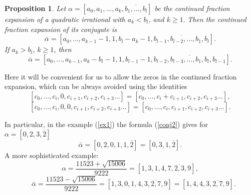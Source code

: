 \documentclass[11pt,reqno]{amsart}
\newtheorem{prop}{Proposition}
\begin{document}
\begin{prop} \label{thm:conj} Let $\alpha = [a_0, a_1, \ldots, a_k, \overline{b_1, \ldots, b_l}]$ be the continued fraction expansion of a quadratic irrational with $a_k < b_l$, and $k \geq 1.$ Then the continued fraction expansion of its conjugate is
\begin{equation}
\label{conj1}
\overline{\alpha} = [a_0, \ldots, a_{k-1}-1, 1, b_l-a_k-1, \overline{b_{l-1}, b_{l-2}, \ldots, b_1, b_l}].
\end{equation}
If $a_k > b_l$, $k \geq 1$, then 
\begin{equation}
\label{conj2}
\overline{\alpha} = \left[a_0, \ldots, a_{k-1}, a_k - b_l-1, 1, b_{l-1}-1, \overline{b_{l-2}, b_{l-3}, \ldots, b_1, b_l, b_{l-1}}\right].
\end{equation}
\end{prop}

Here it will be convenient for us to allow the zeros in the continued fraction expansion, which can be always avoided using the identities
\begin{equation} \label{eq:onezero}
\left[ c_0, \ldots, c_i, 0, c_{i+1}, c_{i+2}, c_{i+3} \ldots \right] = \left[ c_0, \ldots, c_i + c_{i+1}, c_{i+2}, c_{i+3} \ldots \right],
\end{equation}
\begin{equation} \label{eq:twozero}
\left[ c_0, \ldots, c_i, 0, 0, c_{i+1}, c_{i+2}, c_{i+3} \ldots \right] = \left[ c_0, \ldots, c_i, c_{i+1}, c_{i+2}, c_{i+3} \ldots \right].
\end{equation}

In particular, in the example (\ref{ex1}) the formula (\ref{conj2}) gives for $\alpha=[0,2,3,\overline{2}]$
$$
\bar\alpha=[0,2,0,1,1,\bar{2}]=[0,3,1,\overline{2}].
$$
A more sophisticated example:
$$
\alpha=\frac{11523+\sqrt{15006}}{9222}=[1,3,1,4,\overline{7,2,3,9}],
$$
$$
\quad \bar\alpha=\frac{11523-\sqrt{15006}}{9222}=[1,3,0,1,4, \overline{3,2,7,9}] =[1,4,4,\overline{3,2,7,9}].
$$
\end{document}

